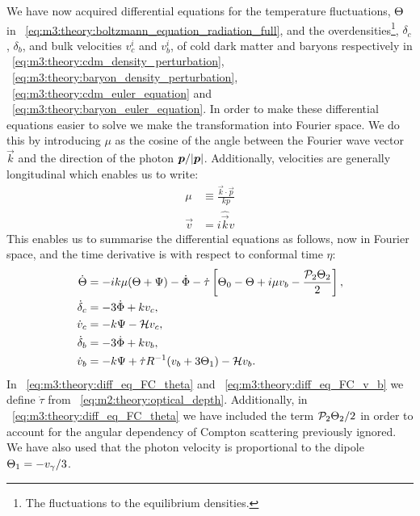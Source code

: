     We have now acquired differential equations for the temperature fluctuations, $\Theta$ in ~\cref{eq:m3:theory:boltzmann_equation_radiation_full}, and the overdensities\footnote{The fluctuations to the equilibrium densities.}, $\delta_c$, $\delta_b$, and bulk velocities $v_c^i$ and $v_b^i$, of cold dark matter and baryons respectively in ~\cref{eq:m3:theory:cdm_density_perturbation}, ~\cref{eq:m3:theory:baryon_density_perturbation}, ~\cref{eq:m3:theory:cdm_euler_equation} and ~\cref{eq:m3:theory:baryon_euler_equation}. In order to make these differential equations easier to solve we make the transformation into Fourier space. We do this by introducing $\mu$ as the cosine of the angle between the Fourier wave vector $\vec{k}$ and the direction of the photon $\boldsymbol{p}/\abs{\boldsymbol{p}}$. Additionally, velocities are generally longitudinal which enables us to write:
    \begin{equation}\label{eq:m3:theory:mu_and_longitudinal_vel_def}
        \begin{split}
            \mu &\equiv \frac{\vec{k}\cdot\vec{p}}{kp} \\
            \vec{v} &= i\hat{\vec{k}}v
        \end{split}
    \end{equation}
    This enables us to summarise the differential equations as follows, now in Fourier space, and the time derivative is with respect to conformal time $\eta$:
    \begin{subequations}\label{eq:m3:theory:diff_eqs_fourier_conformal}
        \begin{align}
            \dot{\Theta} &= -ik\mu(\Theta+\Psi)-\dot{\Phi}-\dot{\tau}\left[\Theta_0-\Theta+i\mu v_b-\frac{\mathcal{P}_2\Theta_2}{2}\right], \label{eq:m3:theory:diff_eq_FC_theta}\\
            \dot{\delta}_c &= -3\dot{\Phi}+kv_c, \label{eq:m3:theory:diff_eq_FC_delta_c}\\
            \dot{v}_c &= -k\Psi-\mathcal{H} v_c, \label{eq:m3:theory:diff_eq_FC_v_c}\\
            \dot{\delta}_b &= -3\dot{\Phi} + kv_b, \label{eq:m3:theory:diff_eq_FC_delta_b}\\
            \dot{v}_b &= -k\Psi + \dot{\tau}R^{-1}(v_b+3\Theta_1) - \mathcal{H} v_b. \label{eq:m3:theory:diff_eq_FC_v_b}
        \end{align}
    \end{subequations}
    In ~\cref{eq:m3:theory:diff_eq_FC_theta} and ~\cref{eq:m3:theory:diff_eq_FC_v_b} we define $\dot{\tau}$ from ~\cref{eq:m2:theory:optical_depth}. Additionally, in ~\cref{eq:m3:theory:diff_eq_FC_theta} we have included the term $\mathcal{P}_2\Theta_2/2$ in order to account for the angular dependency of Compton scattering previously ignored. We have also used that the photon velocity is proportional to the dipole $\Theta_1 = -v_\gamma/3$.

